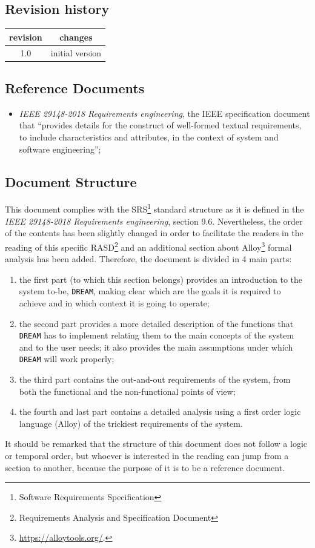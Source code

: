 \documentclass{article}
\begin{document}
\subsection{Revision history}
\begin{left}
\begin{tabular}{ |c | c |}
\hline
 revision & changes \\ 
 \hline
 1.0 &  initial version\\ 
 \hline
\end{tabular}
\end{left}
\subsection{Reference Documents}
\begin{itemize}
\item \textit{IEEE 29148-2018 Requirements engineering}, the IEEE specification document that “provides details for the construct of well-formed textual requirements, to include characteristics and attributes, in the context of system and software engineering”;
\end{itemize}
\subsection{Document Structure}
This document complies with the SRS\footnote{Software Requirements Specification} standard structure as it is defined in the \textit{IEEE 29148-2018 Requirements engineering}, section 9.6. Nevertheless, the order of the contents has been slightly changed in order to facilitate the readers in the reading of this specific RASD\footnote{Requirements Analysis and Specification Document} and an additional section about Alloy\footnote{\url{https://alloytools.org/}.} formal analysis has been added.
Therefore, the document is divided in 4 main parts:
\begin{enumerate}
\item the first part (to which this section belongs) provides an introduction to the system to-be, \verb|DREAM|, making clear which are the goals it is required to achieve and in which context it is going to operate;
\item the second part provides a more detailed description of the functions that \verb|DREAM| has to implement relating them to the main concepts of the system and to the user needs; it also provides the main assumptions under which \verb|DREAM| will work properly;

\item the third part contains the out-and-out requirements of the system, from both the functional and the non-functional points of view;
\item the fourth and last part contains a detailed analysis using a first order logic language (Alloy) of the trickiest requirements of the system.
\end{enumerate}
It should be remarked that the structure of this document does not follow a logic or temporal order, but whoever is interested in the reading can jump from a section to another, because the purpose of it is to be a reference document.
\end{document}
